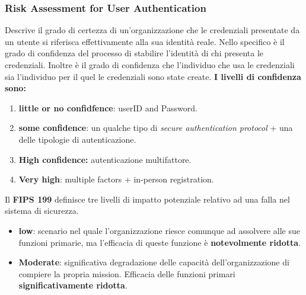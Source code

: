 \documentclass[12pt]{article}
\begin{document}
		\subsubsection{Risk Assessment for User Authentication}
			Descrive il grado di certezza di un'organizzazione che le credenziali presentate da un utente si riferisca effettivamente alla sua identità reale.
			Nello specifico è il grado di confidenza del processo di stabilire l'identità di chi presenta le credenziali. Inoltre è il grado di confidenza che l'individuo che usa le credenziali sia l'individuo per il quel le credenziali sono state create. \textbf{I livelli di confidenza sono:}
			\begin{enumerate}
				\item \textbf{little or no confidfence}: userID and Password.
				\item \textbf{some confidence}: un qualche tipo di \textit{secure authentication protocol} + una delle tipologie di autenticazione.
				\item \textbf{High confidence:} autenticazione multifattore.
				\item \textbf{Very high}:  multiple factors + in-person registration. 
			\end{enumerate}
			Il \textbf{FIPS 199} definisce tre livelli di impatto potenziale relativo ad una falla nel sistema di sicurezza.
			\begin{itemize}
				\item \textbf{low}: scenario nel quale l'organizzazione riesce comunque ad assolvere alle sue funzioni primarie, ma l'efficacia di queste funzione è \textbf{notevolmente ridotta}.
				\item \textbf{Moderate}: significativa degradazione delle capacità dell'organizzazione di compiere la propria mission. Efficacia delle funzioni primari \textbf{significativamente ridotta}.
			\end{itemize}
			
		
		
			 
			 
			 	
	
		
\end{document}
